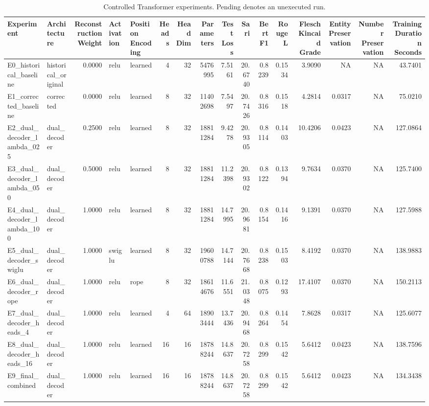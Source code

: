 \begin{table}[t]
\centering
\scriptsize
\setlength{\tabcolsep}{2.5pt}
\begin{tabular}{llrllrrrrrrrrrrr}
\toprule
Experiment & Architecture & Reconstruction Weight & Activation & Position Encoding & Heads & Head Dim & Parameters & Test Loss & Sari & Bert F1 & Rouge L & Flesch Kincaid Grade & Entity Preservation & Number Preservation & Training Duration Seconds \\
\midrule
E0\_historical\_baseline & historical\_original & 0.0000 & relu & learned & 4 & 32 & 5476995 & 7.5161 & 20.6740 & 0.8239 & 0.1534 & 3.9090 & NA & NA & 43.7401 \\
E1\_corrected\_baseline & corrected & 0.0000 & relu & learned & 8 & 32 & 11402698 & 7.5497 & 20.7426 & 0.8316 & 0.1518 & 4.2814 & 0.0317 & NA & 75.0210 \\
E2\_dual\_decoder\_lambda\_025 & dual\_decoder & 0.2500 & relu & learned & 8 & 32 & 18811284 & 9.4278 & 20.9305 & 0.8114 & 0.1403 & 10.4206 & 0.0423 & NA & 127.0864 \\
E3\_dual\_decoder\_lambda\_050 & dual\_decoder & 0.5000 & relu & learned & 8 & 32 & 18811284 & 11.2398 & 20.9302 & 0.8122 & 0.1394 & 9.7634 & 0.0370 & NA & 125.7400 \\
E4\_dual\_decoder\_lambda\_100 & dual\_decoder & 1.0000 & relu & learned & 8 & 32 & 18811284 & 14.7995 & 20.9681 & 0.8154 & 0.1416 & 9.1391 & 0.0370 & NA & 127.5988 \\
E5\_dual\_decoder\_swiglu & dual\_decoder & 1.0000 & swiglu & learned & 8 & 32 & 19600788 & 14.7144 & 20.7668 & 0.8238 & 0.1503 & 8.4192 & 0.0370 & NA & 138.9883 \\
E6\_dual\_decoder\_rope & dual\_decoder & 1.0000 & relu & rope & 8 & 32 & 18614676 & 11.6551 & 21.0348 & 0.8075 & 0.1293 & 17.4107 & 0.0370 & NA & 150.2113 \\
E7\_dual\_decoder\_heads\_4 & dual\_decoder & 1.0000 & relu & learned & 4 & 64 & 18903444 & 13.7436 & 20.9468 & 0.8264 & 0.1454 & 7.8628 & 0.0317 & NA & 125.6077 \\
E8\_dual\_decoder\_heads\_16 & dual\_decoder & 1.0000 & relu & learned & 16 & 16 & 18788244 & 14.8637 & 20.7258 & 0.8299 & 0.1542 & 5.6412 & 0.0423 & NA & 138.7596 \\
E9\_final\_combined & dual\_decoder & 1.0000 & relu & learned & 16 & 16 & 18788244 & 14.8637 & 20.7258 & 0.8299 & 0.1542 & 5.6412 & 0.0423 & NA & 134.3438 \\
\bottomrule
\end{tabular}
\caption{Controlled Transformer experiments. Pending denotes an unexecuted run.}
\label{tab:dual-decoder-transformer}
\end{table}
